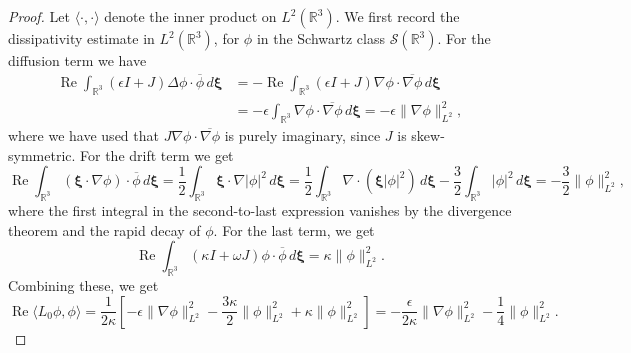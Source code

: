 \documentclass[11pt]{article}
\DeclareMathOperator{\real}{Re}
\newcommand{\conj}[1]{\overline{#1}}
\begin{document}
\begin{proof}
  Let \(\langle \cdot, \cdot\rangle\) denote the inner product on
  \(L^{2}(\mathbb{R}^{3})\). We first record the dissipativity estimate
  in \(L^{2}(\mathbb{R}^{3})\), for \(\phi\) in the Schwartz class
  \(\mathcal{S}(\mathbb{R}^{3})\). For the diffusion term we have
  \begin{equation*}
    \begin{split}
      \real \int_{\mathbb{R}^{3}} (\epsilon I + J)\Delta\phi \cdot \conj{\phi}\,d\bm{\xi}
      &= -\real \int_{\mathbb{R}^{3}} (\epsilon I + J)\nabla\phi \cdot \conj{\nabla\phi}\,d\bm{\xi}\\
      &= -\epsilon \int_{\mathbb{R}^{3}} \nabla\phi \cdot \conj{\nabla\phi}\,d\bm{\xi}
      = -\epsilon\|\nabla\phi\|_{L^{2}}^{2},
    \end{split}
  \end{equation*}
  where we have used that \(J \nabla \phi \cdot \conj{\nabla\phi}\) is
  purely imaginary, since \(J\) is skew-symmetric. For the drift term
  we get
  \begin{equation*}
    \real \int_{\mathbb{R}^{3}} (\bm{\xi} \cdot \nabla\phi) \cdot \conj{\phi}\,d\bm{\xi}
    = \frac{1}{2}\int_{\mathbb{R}^{3}} \bm{\xi} \cdot \nabla |\phi|^{2} \,d\bm{\xi}
    = \frac{1}{2}\int_{\mathbb{R}^{3}} \nabla \cdot (\bm{\xi}|\phi|^{2}) \,d\bm{\xi}
    - \frac{3}{2}\int_{\mathbb{R}^{3}} |\phi|^{2} \,d\bm{\xi}
    = -\frac{3}{2}\|\phi\|_{L^{2}}^{2},
  \end{equation*}
  where the first integral in the second-to-last expression vanishes by
  the divergence theorem and the rapid decay of \(\phi\). For the last
  term, we get
  \begin{equation*}
    \real \int_{\mathbb{R}^{3}} (\kappa I + \omega J)\phi \cdot \conj{\phi}\,d\bm{\xi}
    = \kappa\|\phi\|_{L^{2}}^{2}.
  \end{equation*}
  Combining these, we get
  \begin{equation}\label{eq:L_0-dissipativity-L2}
    \real \langle L_{0}\phi, \phi \rangle
    = \frac{1}{2\kappa}\left[-\epsilon\|\nabla\phi\|_{L^{2}}^{2}
    - \frac{3\kappa}{2}\|\phi\|_{L^{2}}^{2}
    + \kappa\|\phi\|_{L^{2}}^{2}\right]
    = -\frac{\epsilon}{2\kappa}\|\nabla\phi\|_{L^{2}}^{2} - \frac{1}{4}\|\phi\|_{L^{2}}^{2}.
  \end{equation}


\end{proof}
\end{document}
